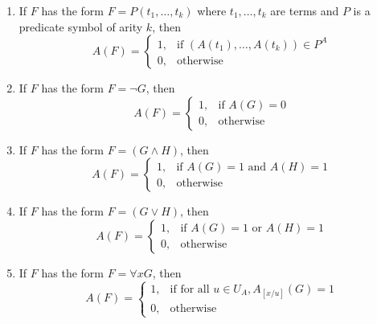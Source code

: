 \begin{enumerate}
    \item If $F$ has the form $F = P( t_1, \ldots, t_k)$ where $t_1, \ldots, t_k$ are terms and $P$ is a predicate symbol of arity $k$, then
    \begin{equation*}
        A(F) =
            \left\{
            \begin{array}{ll}
                  1,& \text{if } (A(t_1), \ldots, A(t_k)) \in P^A \\
                  0,& \text{otherwise}
            \end{array}
            \right.
    \end{equation*}

    \item If $F$ has the form $F= \lnot G$, then
    \begin{equation*}
        A(F) =
            \left\{
            \begin{array}{ll}
                  1,& \text{if } A(G) = 0\\
                  0,& \text{otherwise}
            \end{array}
            \right.
    \end{equation*}

    \item If $F$ has the form $F = (G \wedge H)$, then
    \begin{equation*}
        A(F) =
            \left\{
            \begin{array}{ll}
                  1,& \text{if } A(G) = 1 \text{ and } A(H) = 1\\
                  0,& \text{otherwise}
            \end{array}
            \right.
    \end{equation*}

    \item If $F$ has the form $F = (G \vee H)$, then
    \begin{equation*}
        A(F) =
            \left\{
            \begin{array}{ll}
                  1,& \text{if } A(G) = 1 \text{ or } A(H) = 1\\
                  0,& \text{otherwise}
            \end{array}
            \right.
    \end{equation*}

    \item If $F$ has the form $F = \forall xG$, then
    \begin{equation*}
        A(F) =
            \left\{
            \begin{array}{ll}
                  1,& \text{if for all } u \in U_A, A_{[x/u]}(G) = 1\\
                  0,& \text{otherwise}
            \end{array}
            \right.
    \end{equation*}
\end{enumerate}

